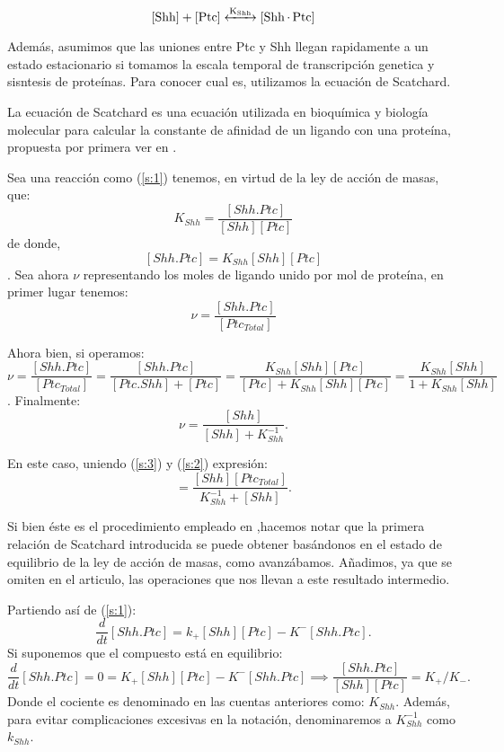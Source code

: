 \begin{equation}
\ce{[Shh] + [Ptc] <->[K_{Shh}] [Shh.Ptc] }
\label{s:1}
\end{equation}
 
 Además, asumimos que las uniones entre Ptc y Shh llegan rapidamente a un estado estacionario si tomamos la escala temporal de transcripción genetica y sisntesis de proteínas. Para conocer cual es, utilizamos la ecuación de Scatchard.
 
 La ecuación de Scatchard es una ecuación utilizada en bioquímica y biología molecular para calcular la constante de afinidad de un ligando con una proteína, propuesta por primera ver en \cite{scatchard1949attractions}. 
 
 Sea una reacción como (\ref{s:1}) tenemos, en virtud de la ley de acción de masas, que: 
 $$K_{Shh}=\frac{[Shh.Ptc]}{[Shh][Ptc]}$$
 de donde, 
 $$[Shh.Ptc]=K_{Shh}[Shh][Ptc]$$.
 Sea ahora $\nu$ representando los moles de ligando unido por mol de proteína, en primer lugar tenemos:
 \begin{equation}
 \nu=\frac{[Shh.Ptc]}{[Ptc_{Total}]}
 \label{s:2}
 \end{equation}
 
 Ahora bien, si operamos:
 $$\nu=\frac{[Shh.Ptc]}{[Ptc_{Total}]}=\frac{[Shh.Ptc]}{[Ptc.Shh]+[Ptc]}=\frac{K_{Shh}[Shh][Ptc]}{[Ptc]+K_{Shh}[Shh][Ptc]}=\frac{K_{Shh}[Shh]}{1+K_{Shh}[Shh]}$$.
 Finalmente:
 \begin{equation}
 \nu=\frac{[Shh]}{[Shh]+K_{Shh}^{-1}}.
 \label{s:3}
 \end{equation}
 
 En este caso, uniendo (\ref{s:3}) y (\ref{s:2}) expresión: 
 \begin{equation}
 [Shh.Ptc]=\frac{[Shh][Ptc_{Total}]}{K_{Shh}^{-1}+[Shh]}.
 \label{s:6}
 \end{equation}
 
 Si bien éste es el procedimiento empleado en \cite{schaffer},hacemos notar que la primera relación de Scatchard introducida se puede obtener basándonos en el estado de equilibrio de la ley de acción de masas, como avanzábamos. Añadimos, ya que se omiten en el articulo, las operaciones que nos llevan a este resultado intermedio.
 
 Partiendo así de (\ref{s:1}): 
  \begin{equation}
  \frac{d}{dt}[Shh.Ptc]=k_+[Shh][Ptc]-K^-[Shh.Ptc].
  \label{s:8}
  \end{equation}
 Si suponemos que el compuesto está en equilibrio:
  \begin{equation}
 \frac{d}{dt}[Shh.Ptc]=0=K_+[Shh][Ptc]-K^-[Shh.Ptc] \implies \frac{[Shh.Ptc]}{[Shh][Ptc]}=K_+/K_- .
 \label{s:9}
 \end{equation}
 Donde el cociente es denominado en las cuentas anteriores como: $K_{Shh}$. Además, para evitar complicaciones excesivas en la notación, denominaremos a $K_{Shh}^{-1}$ como $k_{Shh}$.
 
